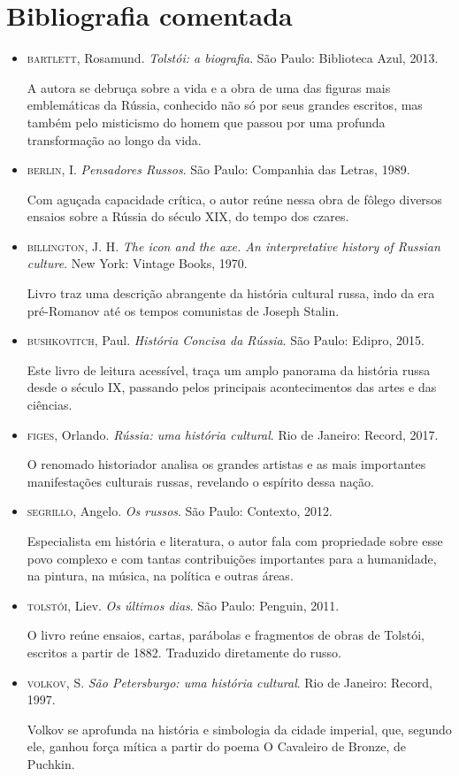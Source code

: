 \documentclass[12pt]{extarticle}
\begin{document}
\section{Bibliografia comentada}

\begin{itemize}
\item\textsc{bartlett}, Rosamund. \textit{Tolstói: a biografia}. São Paulo: Biblioteca Azul, 2013.

A autora se debruça sobre a vida e a obra de uma das figuras mais
emblemáticas da Rússia, conhecido não só por seus grandes escritos, mas
também pelo misticismo do homem que passou por uma profunda
transformação ao longo da vida.

\item\textsc{berlin}, I. \textit{Pensadores Russos}. São Paulo: Companhia das Letras, 1989.

Com aguçada capacidade crítica, o autor reúne nessa obra de fôlego
diversos ensaios sobre a Rússia do século XIX, do tempo dos czares.

\item\textsc{billington}, J. H. \textit{The icon and the axe. An interpretative
history of Russian culture}. New York: Vintage Books, 1970.

Livro traz uma descrição abrangente da história cultural russa, indo da
era pré-Romanov até os tempos comunistas de Joseph Stalin.

\item\textsc{bushkovitch}, Paul. \textit{História Concisa da Rússia}. São Paulo:
Edipro, 2015.

Este livro de leitura acessível, traça um amplo panorama da história
russa desde o século IX, passando pelos principais acontecimentos das
artes e das ciências.

\item\textsc{figes}, Orlando. \textit{Rússia: uma história cultural}. Rio de Janeiro: Record, 2017.

O renomado historiador analisa os grandes artistas e as mais importantes
manifestações culturais russas, revelando o espírito dessa nação.

\item\textsc{segrillo}, Angelo. \textit{Os russos}. São Paulo: Contexto, 2012.

Especialista em história e literatura, o autor fala com propriedade
sobre esse povo complexo e com tantas contribuições importantes para a
humanidade, na pintura, na música, na política e outras áreas.

\item\textsc{tolstói}, Liev. \textit{Os últimos dias}. São Paulo: Penguin, 2011.

O livro reúne ensaios, cartas, parábolas e fragmentos de obras de
Tolstói, escritos a partir de 1882. Traduzido diretamente do russo.

\item\textsc{volkov}, S. \textit{São Petersburgo: uma história cultural}. Rio de
Janeiro: Record, 1997.

Volkov se aprofunda na história e simbologia da cidade imperial, que,
segundo ele, ganhou força mítica a partir do poema O Cavaleiro de
Bronze, de Puchkin.
\end{itemize}
\end{document}
